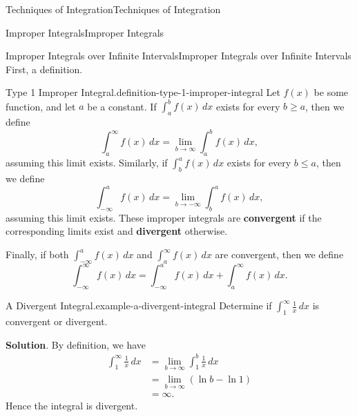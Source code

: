 \documentclass[10pt,]{book}
\newcommand{\terminology}[1]{\textbf{#1}}
\numberwithin{equation}{section}
\begin{document}
\begin{chapterptx}{Techniques of Integration}{}{Techniques of Integration}{}{}
\begin{sectionptx}{Improper Integrals}{}{Improper Integrals}{}{}
\begin{introduction}{}
\end{introduction}%
%
%
\typeout{************************************************}
\typeout{************************************************}
%
\begin{subsectionptx}{Improper Integrals over Infinite Intervals}{}{Improper Integrals over Infinite Intervals}{}{}\label{subsection-improper-integrals-over-infinite-intervals}
\hypertarget{p-579}{}%
First, a definition.%
\begin{definition}{Type 1 Improper Integral.}{definition-type-1-improper-integral}%
\hypertarget{p-580}{}%
Let \(f(x)\) be some function, and let \(a\) be a constant. If \(\int_{a}^{b}f(x)\,dx\) exists for every \(b\geq a\), then we define%
\begin{equation*}
\int_{a}^{\infty}f(x)\,dx = \lim_{b\to\infty}\int_{a}^{b}f(x)\,dx,
\end{equation*}
assuming this limit exists. Similarly, if \(\int_{b}^{a}f(x)\,dx\) exists for every \(b\leq a\), then we define%
\begin{equation*}
\int_{-\infty}^{a}f(x)\,dx = \lim_{b\to-\infty}\int_{b}^{a}f(x)\,dx,
\end{equation*}
assuming this limit exists. These improper integrals are \terminology{convergent} if the corresponding limits exist and \terminology{divergent} otherwise.%
\par
\hypertarget{p-581}{}%
Finally, if both \(\int_{-\infty}^{a}f(x)\,dx\) and \(\int_{a}^{\infty}f(x)\,dx\) are convergent, then we define%
\begin{equation*}
\int_{-\infty}^{\infty}f(x)\,dx = \int_{-\infty}^{a}f(x)\,dx + \int_{a}^{\infty}f(x)\,dx.
\end{equation*}
%
\end{definition}
\begin{example}{A Divergent Integral.}{example-a-divergent-integral}%
\hypertarget{p-582}{}%
Determine if \(\int_{1}^{\infty}\frac{1}{x}\,dx\) is convergent or divergent.%
\par\smallskip%
\noindent\textbf{Solution}.\hypertarget{solution-126}{}\quad%
\hypertarget{p-583}{}%
By definition, we have%
\begin{align*}
\int_{1}^{\infty}\frac{1}{x}\,dx & = \lim_{b\to\infty}\int_{1}^{b}\frac{1}{x}\,dx \\
& = \lim_{b\to\infty}(\ln b - \ln 1) \\
& = \infty. 
\end{align*}
Hence the integral is divergent.%

\end{example}
\end{subsectionptx}
\end{sectionptx}
\end{chapterptx}
\end{document}
